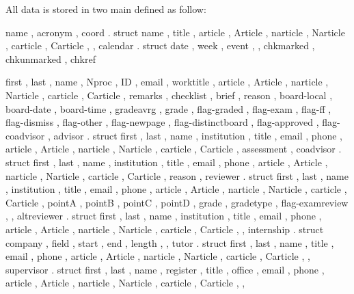 \documentclass[article,nogeometry,english,tocdepth=3,secdepth=3]{ufrgscca} %
\begin{document}
All data is stored in two main  defined as follow:

\begin{codestore}[st=activitydef]
  {
    name , acronym ,
    coord . struct 
      {
        name , title ,
        article , Article , narticle , Narticle , carticle , Carticle ,
      } ,
    calendar . struct
      {
        date ,  week , event ,
      } ,
      chkmarked , chkunmarked , chkref
  }
\end{codestore}

\label{activity-def}


\begin{codestore}[st=studentdef]
 {
  first , last , name , Nproc , ID , email , worktitle ,
        article , Article , narticle , Narticle , carticle , Carticle ,
  remarks , checklist , brief , reason , 
  board-local , board-date , board-time , gradeavrg , grade ,
  flag-graded , %
  flag-exam ,
  flag-ff ,
  flag-dismiss , %
  flag-other   , %
  flag-newpage , %
  flag-distinctboard , %
  flag-approved ,
  flag-coadvisor ,
  advisor . struct {
    first , last , name , institution , title , email , phone ,    
        article , Article , narticle , Narticle , carticle , Carticle ,
    assessment 
  } ,
  coadvisor . struct {
    first , last , name , institution , title , email , phone ,    
        article , Article , narticle , Narticle , carticle , Carticle ,
    reason 
  } ,
  reviewer . struct {
    first , last , name , institution , title , email , phone ,    
        article , Article , narticle , Narticle , carticle , Carticle ,
    pointA , pointB , pointC , pointD , grade , gradetype ,  flag-examreview ,  
  } ,
  altreviewer . struct {
    first , last , name , institution , title , email , phone ,    
        article , Article , narticle , Narticle , carticle , Carticle ,
  } ,
  internship . struct {
    company , field , start , end , length , 
  } ,
  tutor . struct {
    first , last , name , title , email , phone ,    
        article , Article , narticle , Narticle , carticle , Carticle ,
  } ,
  supervisor . struct {
    first , last , name , register , title , office , email , phone ,    
        article , Article , narticle , Narticle , carticle , Carticle ,
  } ,
 }
\end{codestore}
\end{document}
